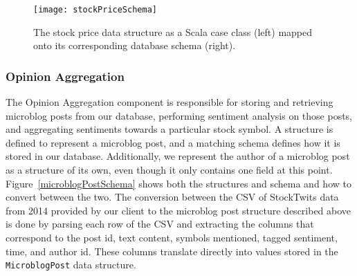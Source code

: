 \begin{figure}[h]
  \label{stockPriceSchema}
  \begin{center}
    \texttt{[image: stockPriceSchema]}
  \end{center}
  \caption{The stock price data structure as a Scala case class (left) mapped onto its corresponding database schema (right).}
\end{figure}

\subsubsection{Opinion Aggregation}

The Opinion Aggregation component is responsible for storing and retrieving microblog posts from our database, performing sentiment analysis on those posts, and aggregating sentiments towards a particular stock symbol. A structure is defined to represent a microblog post, and a matching schema defines how it is stored in our database. Additionally, we represent the author of a microblog post as a structure of its own, even though it only contains one field at this point. Figure~\ref{microblogPostSchema} shows both the structures and schema and how to convert between the two. The conversion between the CSV of StockTwits data from 2014 provided by our client to the microblog post structure described above is done by parsing each row of the CSV and extracting the columns that correspond to the post id, text content, symbols mentioned, tagged sentiment, time, and author id. These columns translate directly into values stored in the \texttt{MicroblogPost} data structure.

